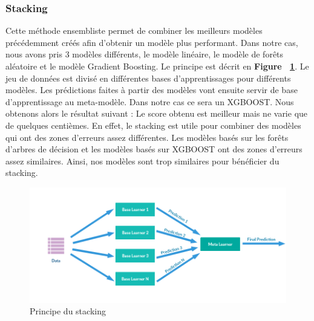 \documentclass{article} %
\begin{document}
\subsubsection{Stacking}
Cette méthode ensembliste permet de combiner les meilleurs modèles précédemment créés afin d'obtenir un modèle plus performant. Dans notre cas, nous avons pris 3 modèles différents, le modèle linéaire, le modèle de forêts aléatoire et le modèle Gradient Boosting. Le principe est décrit en \textbf{Figure ~\ref{fig:stacking}}. Le jeu de données est divisé en différentes bases d'apprentissages pour différents modèles. Les prédictions faites à partir des modèles vont ensuite servir de base d'apprentissage au meta-modèle. Dans notre cas ce sera un XGBOOST. Nous obtenons alors le résultat suivant : 
Le score obtenu est meilleur mais ne varie que de quelques centièmes. En effet, le stacking est utile pour combiner des modèles qui ont des zones d'erreurs assez différentes. Les modèles basés sur les forêts d'arbres de décision et les modèles basés sur XGBOOST ont des zones d'erreurs assez similaires. Ainsi, nos modèles sont trop similaires pour bénéficier du stacking.

\begin{figure}[!h]
	\centering
	\includegraphics[keepaspectratio = true,scale=0.65]{stacking.png}
	\caption{Principe du stacking}
	\label{fig:stacking}
\end{figure}
\newpage
\end{document}
